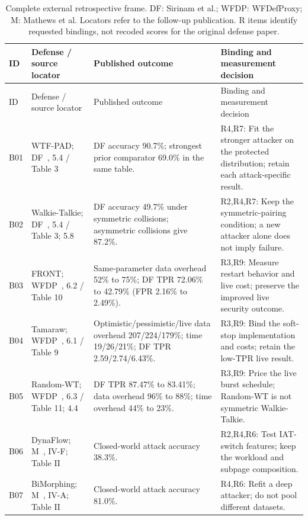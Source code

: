 {\footnotesize
\begin{longtable}{@{}p{}p{}p{}p{}@{}}
\caption{Complete external retrospective frame. DF: Sirinam et al.; WFDP: WFDefProxy; M: Mathews et al. Locators refer to the follow-up publication. R items identify requested bindings, not recoded scores for the original defense paper.}\label{tab:r28-external-ledger}\\
\toprule ID & Defense / source locator & Published outcome & Binding and measurement decision\\\midrule\endfirsthead
\toprule ID & Defense / source locator & Published outcome & Binding and measurement decision\\\midrule\endhead
\bottomrule\endfoot
B01 & WTF-PAD; DF~\cite{sirinam2018deep}, 5.4 / Table 3 & DF accuracy 90.7\%; strongest prior comparator 69.0\% in the same table. & R4,R7: Fit the stronger attacker on the protected distribution; retain each attack-specific result.\\
B02 & Walkie-Talkie; DF~\cite{sirinam2018deep}, 5.4 / Table 3; 5.8 & DF accuracy 49.7\% under symmetric collisions; asymmetric collisions give 87.2\%. & R2,R4,R7: Keep the symmetric-pairing condition; a new attacker alone does not imply failure.\\
B03 & FRONT; WFDP~\cite{gong2021wfdefproxy}, 6.2 / Table 10 & Same-parameter data overhead 52\% to 75\%; DF TPR 72.06\% to 42.79\% (FPR 2.16\% to 2.49\%). & R3,R9: Measure restart behavior and live cost; preserve the improved live security outcome.\\
B04 & Tamaraw; WFDP~\cite{gong2021wfdefproxy}, 6.1 / Table 9 & Optimistic/pessimistic/live data overhead 207/224/179\%; time 19/26/21\%; DF TPR 2.59/2.74/6.43\%. & R3,R9: Bind the soft-stop implementation and costs; retain the low-TPR live result.\\
B05 & Random-WT; WFDP~\cite{gong2021wfdefproxy}, 6.3 / Table 11; 4.4 & DF TPR 87.47\% to 83.41\%; data overhead 96\% to 88\%; time overhead 44\% to 23\%. & R3,R9: Price the live burst schedule; Random-WT is not symmetric Walkie-Talkie.\\
B06 & DynaFlow; M~\cite{mathews2023critical}, IV-F; Table II & Closed-world attack accuracy 38.3\%. & R2,R4,R6: Test IAT-switch features; keep the workload and subpage composition.\\
B07 & BiMorphing; M~\cite{mathews2023critical}, IV-A; Table II & Closed-world attack accuracy 81.0\%. & R4,R6: Refit a deep attacker; do not pool different datasets.\\

\end{longtable}}
